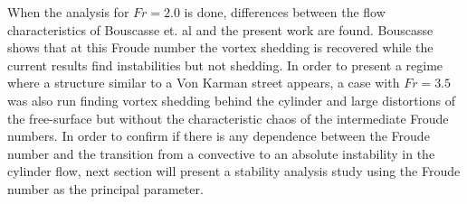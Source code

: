 When the analysis for $Fr=2.0$ is done, differences between the flow characteristics of Bouscasse et. al \cite{Bouscasse14} and the present work are found. Bouscasse shows that at this Froude number the vortex shedding is recovered while the current results find instabilities but not shedding. In order to present a regime where a structure similar to a Von Karman street appears, a case with $Fr=3.5$ was also run finding vortex shedding behind the cylinder and large distortions of the free-surface but without the characteristic chaos of the intermediate Froude numbers. In order to confirm if there is any dependence between the Froude number and the transition from a convective to an absolute instability in the cylinder flow, next section will present a stability analysis study using the Froude number as the principal parameter.


